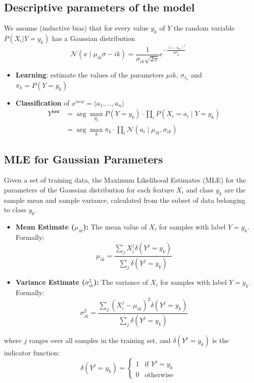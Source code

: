 \subsection{Descriptive parameters of the model}
We assume (inductive bias) that for every value $y_k$ of $Y$ the
random variable $P(X_i |Y = y_k )$ has a Gaussian distribution
\[
    \mathcal{N}(x\mid \mu_{ik} \sigma-{ik}) = \frac{1}{\sigma_{ik}\sqrt{2\pi}}e^{-\frac{(x-u_{ik})^2}{2\sigma^2_{ik}}}
\]
\begin{itemize}
    \item \textbf{Learning}: estimate the values of the parameters $ \mu i k $, $\sigma_{i_k}$ and $\pi_k = P(Y = y_k )$
    \item \textbf{Classification} of $x^{new} = \langle a_1,\dots, a_n\rangle$
        \begin{align*}
            Y^{\texttt{new}} &= \arg \max_{y_k} P(Y= y_k ) \cdot \prod_{i} P(X_i = a_i \mid Y = y_k )\\
            &= \arg \max_{k}\pi_k\cdot \prod_{i}\mathcal{N}(a_i\mid \mu_{ik},\sigma_{ik})
        \end{align*}
\end{itemize}

\subsection{MLE for Gaussian Parameters}
Given a set of training data, the Maximum Likelihood Estimates (MLE) for the parameters of the Gaussian distribution for each feature $X_i$ and class $y_k$ are the sample mean and sample variance, calculated from the subset of data belonging to class $y_k$.
    
    \begin{itemize}
        \item \textbf{Mean Estimate ($\mu_{ik}$):} The mean value of $X_i$ for samples with label $Y=y_k$. Formally:
        \[
            \mu_{ik} = \frac{\sum_j X_i^j \delta(Y^j = y_k)}{\sum_j \delta(Y^j = y_k)}
        \]
        \item \textbf{Variance Estimate ($\sigma_{ik}^2$):} The variance of $X_i$ for samples with label $Y=y_k$. Formally:
        \[
            \sigma^2_{ik} = \frac{\sum_j (X_i^j - \mu_{ik})^2 \delta(Y^j = y_k)}{\sum_j \delta(Y^j = y_k)}
        \]
    \end{itemize}
    where $j$ ranges over all samples in the training set, and $\delta(Y^j = y_k)$ is the indicator function:
    \[
        \delta(Y^j = y_k) = \begin{cases} 
            1 & \text{if } Y^j = y_k \\ 
            0 & \text{otherwise} 
        \end{cases}
    \]

